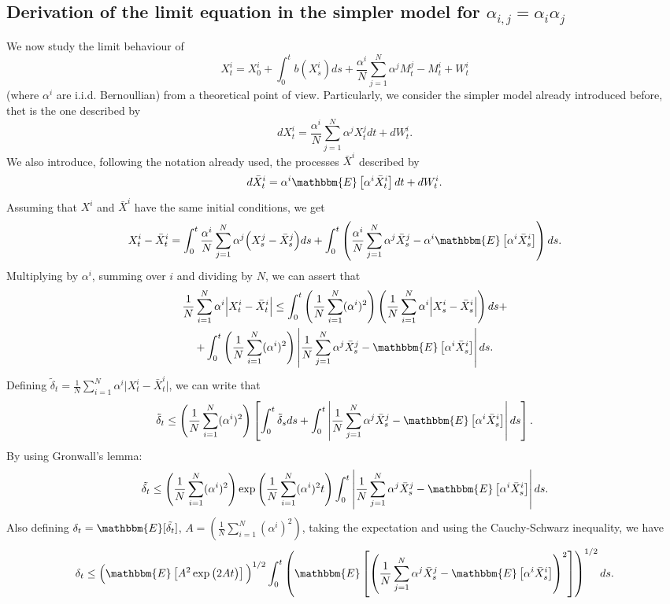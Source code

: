 \subsection{Derivation of the limit equation in the simpler model for $\alpha_{i,j}=\alpha_i\alpha_j$}
We now study the limit behaviour of \[ X^i_t = X^i_0 + \int_0^t b(X^i_s) ds + \frac{\alpha^i}{N} \sum_{j = 1}^N \alpha^j M^j_t - M^i_t + W^i_t \] (where $\alpha^i$ are i.i.d. Bernoullian) from a theoretical point of view. Particularly, we consider the simpler model already introduced before, thet is the one described by \[ d X^i_t = \frac{\alpha^i}{N} \sum_{j = 1}^N \alpha^j X^j_t dt + d W^i_t. \]
We also introduce, following the notation already used, the processes $\bar{X}^i$ described by \[ d \bar{X}^i_t = \alpha^i \mathbbm{E} \left[ \alpha^i \bar{X}^i_t \right] dt + d W^i_t. \]
Assuming that $X^i$ and $\bar{X}^i$ have the same initial conditions, we get \[ X^i_t - \bar{X}^i_t = \int_0^t \frac{\alpha^i}{N} \sum_{j = 1}^N \alpha^j \Big( X^j_s - \bar{X}^j_s \Big) ds + \int_0^t \left( \frac{\alpha^i}{N} \sum_{j = 1}^N \alpha^j \bar{X}^j_s - \alpha^i \mathbbm{E} \left[ \alpha^i \bar{X}^i_s \right] \right) ds. \]
Multiplying by $\alpha^i$, summing over $i$ and dividing by $N$, we can assert that \begin{multline*} \frac{1}{N} \sum_{i = 1}^N \alpha^i \Big| X^i_t - \bar{X}^i_t \Big| \leq \int_0^t \left( \frac{1}{N} \sum_{i = 1}^N (\alpha^i)^2 \right) \left( \frac{1}{N} \sum_{i = 1}^N \alpha^i \Big| X^i_s - \bar{X}^i_s \Big| \right) ds + \\ + \int_0^t \left( \frac{1}{N} \sum_{i = 1}^N (\alpha^i)^2 \right) \left| \frac{1}{N} \sum_{j = 1}^N \alpha^j \bar{X}^j_s - \mathbbm{E} \left[ \alpha^i \bar{X}^i_s \right] \right| ds. \end{multline*}
Defining $\tilde{\delta}_t = \frac{1}{N} \sum_{i = 1}^N \alpha^i \big| X^i_t - \bar{X}^i_t \big|$, we can write that \[ \tilde{\delta}_t \leq \left( \frac{1}{N} \sum_{i = 1}^N (\alpha^i)^2 \right) \left[ \int_0^t \tilde{\delta}_s ds + \int_0^t \left| \frac{1}{N} \sum_{j = 1}^N \alpha^j \bar{X}^j_s - \mathbbm{E} \left[ \alpha^i \bar{X}^i_s \right] \right| ds \right]. \]
By using Gronwall's lemma: \[ \tilde{\delta_t} \leq \left( \frac{1}{N} \sum_{i = 1}^N (\alpha^i)^2 \right) \exp \left( \frac{1}{N} \sum_{i = 1}^N (\alpha^i)^2 t \right) \int_0^t \left| \frac{1}{N} \sum_{j = 1}^N \alpha^j \bar{X}^j_s - \mathbbm{E} \left[ \alpha^i \bar{X}^i_s \right] \right| ds. \]
Also defining $\delta_t = \mathbbm{E}[\tilde{\delta_t}]$, $A = \left( \frac{1}{N} \sum_{i = 1}^N (\alpha^i)^2 \right)$, taking the expectation and using the Cauchy-Schwarz inequality, we have \[ \delta_t \leq \Big( \mathbbm{E} \left[ A^2 \exp \big( 2 A t \big) \right] \Big)^{1/2} \int_0^t \left( \mathbbm{E} \left[ \left( \frac{1}{N} \sum_{j = 1}^N \alpha^j \bar{X}^j_s - \mathbbm{E} \left[ \alpha^i \bar{X}^i_s \right] \right)^2 \right] \right)^{1/2} ds. \]
